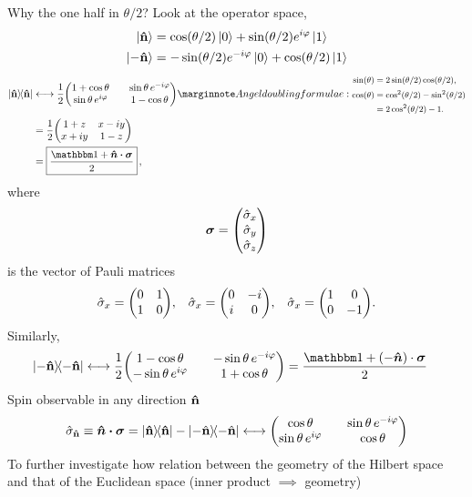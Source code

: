 \noindent Why the one half in $\theta/2$? Look at the operator space,
\begin{align}
	\ket{\bf \hat n} &= \cos(\theta/2) \ket{0} + \sin(\theta/2) e^{i\varphi} \ket{1} \\
	\ket{\bf -\hat n} &= -\sin(\theta/2)e^{-i\varphi} \ket{0} + \cos(\theta/2) \ket{1}
\end{align}
\begin{align}
	\dyad{\bf \hat n} &\longleftrightarrow \frac{1}{2} \mqty(1+\cos\theta && \sin\theta\,e^{-i\varphi} \\ \sin\theta\,e^{i\varphi} && 1-\cos\theta)  \mnf{Angel doubling formulae: 
	\begin{align*}
	\sin(\theta) &= 2\sin(\theta/2)\cos(\theta/2), \\
	\cos(\theta) &= \cos^2(\theta/2) - \sin^2(\theta/2) \\ 
	&= 2\cos^2(\theta/2) - 1.	
	\end{align*}} \\
	&= \frac{1}{2}\mqty(1+z & x-iy \\ x+iy & 1-z) \\
	&= \boxed{\frac{\id + \boldsymbol{\hat n \cdot \sigma}}{2}}\, , 
\end{align}
where 
\begin{align}
	\boldsymbol{\sigma} = \mqty(\hat\sigma_x \\ \hat\sigma_y \\ \hat\sigma_z)
\end{align}
is the vector of Pauli matrices
\begin{align}
	\hat\sigma_x = \mqty(0&1\\1&0), &&  \hat\sigma_x = \mqty(0&-i\\i&0), && \hat\sigma_x = \mqty(1&0\\0&-1).
\end{align}
Similarly,
\begin{align}
	\dyad{\bf -\hat n} &\longleftrightarrow \frac{1}{2} \mqty(1-\cos\theta && -\sin\theta\,e^{-i\varphi} \\ -\sin\theta\,e^{i\varphi} && 1+\cos\theta) = \frac{\id + {(-\boldsymbol{\hat n}) \cdot \boldsymbol\sigma}}{2} 
\end{align}
Spin observable in any direction ${\bf \hat{n}}$
\begin{align}
	\hat\sigma_{\bf \hat n} \equiv \boldsymbol{\hat n\cdot\sigma} = \dyad{\bf \hat n} - \dyad{-\hat {\bf n}} \longleftrightarrow \mqty(\cos\theta && \sin\theta\,e^{-i\varphi} \\ \sin\theta\,e^{i \varphi} && \cos\theta) 
\end{align}
To further investigate how relation between the geometry of the Hilbert space and that of the Euclidean space (inner product $\implies$ geometry)

